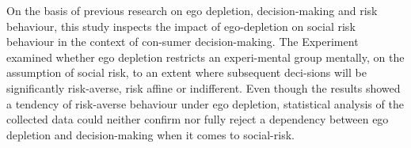 \onehalfspacing
On the basis of previous research on ego depletion, decision-making and risk behaviour, this study inspects the impact of ego-depletion on social risk behaviour in the context of con-sumer decision-making. The Experiment examined whether ego depletion restricts an experi-mental group mentally, on the assumption of social risk, to an extent where subsequent deci-sions will be significantly risk-averse, risk affine or indifferent. Even though the results showed a tendency of risk-averse behaviour under ego depletion, statistical analysis of the collected data could neither confirm nor fully reject a dependency between ego depletion and decision-making when it comes to social-risk.